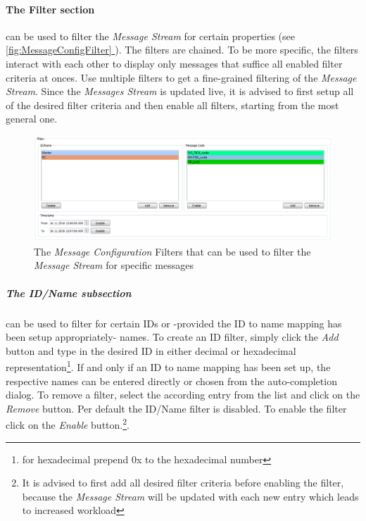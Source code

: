 \documentclass[12pt,a4paper]{scrartcl}
\newcommand*{\fullref}[1]{\hyperref[{#1}]{\autoref*{#1} \nameref*{#1}}} %
\begin{document}
\FloatBarrier

\paragraph{The Filter section} can be used to filter the \textit{Message Stream} for certain properties (see \fullref{fig:MessageConfigFilter}). The filters are chained. To be more specific, the filters interact with each other to display only messages that suffice all enabled filter criteria at onces. Use multiple filters to get a fine-grained filtering of the \textit{Message Stream}. Since the \textit{Messages Stream} is updated live, it is advised to first setup all of the desired filter criteria and then enable all filters, starting from the most general one.

\begin{figure}
	\centering
	\includegraphics[width=0.8\linewidth,keepaspectratio]{Graphics/MessageConfigFilter}
	\caption[Message Configuration Filter]{The \textit{Message Configuration} Filters that can be used to filter the \textit{Message Stream} for specific messages}
	\label{fig:MessageConfigFilter}
\end{figure}

\subparagraph{The ID/Name subsection} can be used to filter for certain IDs or -provided the ID to name mapping has been setup appropriately- names. To create an ID filter, simply click the \textit{Add} button and type in the desired ID in either decimal or hexadecimal representation\footnote{for hexadecimal prepend 0x to the hexadecimal number}. If and only if an ID to name mapping has been set up, the respective names can be entered directly or chosen from the auto-completion dialog. To remove a filter, select the according entry from the list and click on the \textit{Remove} button. Per default the ID/Name filter is disabled. To enable the filter click on the \textit{Enable} button.\footnote{It is advised to first add all desired filter criteria before enabling the filter, because the \textit{Message Stream} will be updated with each new entry which leads to increased workload}.
\end{document}
